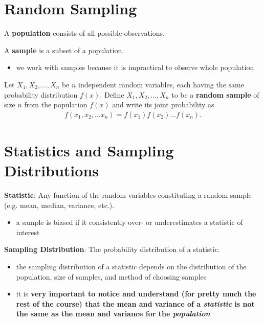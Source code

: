 \documentclass[10pt]{article}
\begin{document}
\section{Random Sampling}
\begin{definition}
    A \textbf{population} consists of all possible observations.
\end{definition}
\begin{definition}
    A \textbf{sample} is a subset of a population.
    \begin{itemize}
        \item we work with samples because it is impractical to observe whole population
    \end{itemize}
\end{definition}
\begin{definition}
    Let $X_1, X_2, \ldots, X_n$ be $n$ independent random variables, each having the same probability distribution $f(x)$. Define $X_1, X_2, \ldots, X_n$ to be a \textbf{random sample} of size $n$ from the population $f(x)$ and write its joint probability as 
    \begin{gather*}
        f(x_1, x_2, \ldots x_n) = f(x_1)f(x_2)\ldots f(x_n)
    .\end{gather*}
\end{definition}

\section{Statistics and Sampling Distributions}
\begin{definition}
    \textbf{Statistic}: Any function of the random variables constituting a random sample (e.g. mean, median, variance, etc.).
\end{definition}
\begin{itemize}
    \item a sample is biased if it consistently over- or underestimates a statistic of interest
\end{itemize}

\begin{definition}
    \textbf{Sampling Distribution}: The probability distribution of a statistic.
\end{definition}
\begin{itemize}
    \item the sampling distribution of a statistic depends on the distribution of the population, size of samples, and method of choosing samples
    \item it is \textbf{very important to notice and understand (for pretty much the rest of the course) that the mean and variance of a \textit{statistic} is not the same as the mean and variance for the \textit{population}}
\end{itemize}
\end{document}
